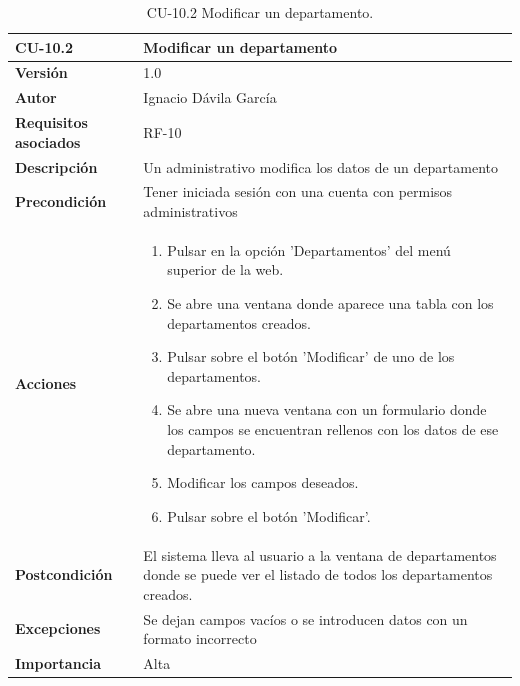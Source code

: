 \begin{table}[p]
	\centering
	\begin{tabularx}{\linewidth}{ p{} p{} }
		\toprule
		\textbf{CU-10.2}    & \textbf{Modificar un departamento}\\
		\toprule
		\textbf{Versión}              & 1.0    \\
		\textbf{Autor}                & Ignacio Dávila García \\
		\textbf{Requisitos asociados} & RF-10 \\
		\textbf{Descripción}          & Un administrativo modifica los datos de un departamento \\
		\textbf{Precondición}         & Tener iniciada sesión con una cuenta con permisos administrativos \\
		\textbf{Acciones}             &
		\begin{enumerate}
			\def\labelenumi{\arabic{enumi}.}
			\tightlist
			\item Pulsar en la opción 'Departamentos' del menú superior de la web.
			\item Se abre una ventana donde aparece una tabla con los departamentos creados.
			\item Pulsar sobre el botón 'Modificar' de uno de los departamentos.
			\item Se abre una nueva ventana con un formulario donde los campos se encuentran rellenos con los datos de ese departamento.
			\item Modificar los campos deseados.
			\item Pulsar sobre el botón 'Modificar'.
		\end{enumerate}\\
		\textbf{Postcondición}        & El sistema lleva al usuario a la ventana de departamentos donde se puede ver el listado de todos los departamentos creados. \\
		\textbf{Excepciones}          & Se dejan campos vacíos o se introducen datos con un formato incorrecto \\
		\textbf{Importancia}          & Alta \\
		\bottomrule
	\end{tabularx}
	\caption{CU-10.2 Modificar un departamento.}
\end{table}

